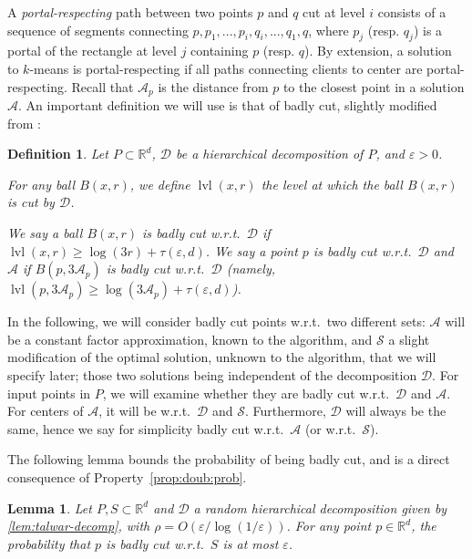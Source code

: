 \documentclass[11pt]{article}
\newtheorem{lemma}[theorem]{Lemma}
\newtheorem{definition}[theorem]{Definition}
\newcommand{\R}{\mathbb R}
\newcommand{\eps}{\varepsilon}
\newcommand{\calD}{\mathcal {D}}
\newcommand{\calS}{\mathcal {S}}
\newcommand{\calL}{\mathcal{A}}
\newcommand{\badcut}{\eps}
\newcommand{\offset}{\tau(\eps, d)}
\DeclareMathOperator{\level}{lvl}
\begin{document}
A \emph{portal-respecting} path between two points $p$ and $q$ cut at level $i$ consists of a sequence of segments connecting $p, p_1, ..., p_i, q_i, ..., q_1, q$, where $p_j$ (resp. $q_j$) is a portal of the rectangle at level $j$ containing $p$ (resp. $q$). 
By extension, a solution to $k$-means is portal-respecting if all paths connecting clients to center are portal-respecting. Recall that $\calL_p$ is the distance from $p$ to the closest point in a solution $\calL$. An important definition we will use is that of badly cut, slightly modified from \cite{jacm}:

\begin{definition}\label{def:badlycut}
  Let $P\subset \R^d$, $\calD$ be 
a hierarchical decomposition of $P$, and $\eps > 0$. 

For any ball $B(x, r)$, we define $\level(x, r)$ the level at which the ball $B(x,r)$ is cut by $\calD$. 

We say a ball $B(x, r)$ is \emph{badly cut w.r.t.\ $\calD$} if 
$\level(x, r) \geq \log(3r) + \offset$.
We say a point $p$ is \emph{badly cut w.r.t.\ $\calD$ and $\calL$} if $B(p, 3\calL_p)$ is badly cut w.r.t.\ $\calD$ (namely,
$\level(p, 3\calL_p) \geq \log(3\calL_p) + \offset$).
\end{definition}

In the following, we will consider badly cut points w.r.t.\ two different sets: 
$\calL$ will be a  constant factor approximation, known to the algorithm, and $\calS$ a slight modification of the optimal solution, unknown to the algorithm, that we will specify later; those two solutions being independent of the decomposition $\calD$.
For input points in $P$, we will examine whether they are badly cut w.r.t.\ $\calD$ and $\calL$. 
For centers of $\calL$, it will be w.r.t.\ $\calD$ and $\calS$. 
Furthermore, $\calD$ will always be the same, hence we  say for simplicity badly cut w.r.t.\ $\calL$ (or w.r.t.\ $\calS$).

The following lemma bounds the probability of being badly cut, and is a direct consequence of Property~\ref{prop:doub:prob}.
\begin{lemma}\label{lem:badlycutddim}
  Let $P, S \subset \R^d$ and $\calD$ a random hierarchical 
  decomposition given by \cref{lem:talwar-decomp}, with $\rho = O(\eps/\log(1/\eps))$.
 For any point $p \in \R^d$, the probability that $p$ is badly cut w.r.t.\  $S$
  is at most $\badcut$.
\end{lemma}
\end{document}
